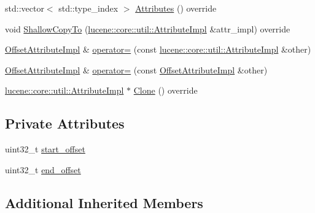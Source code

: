\begin{DoxyCompactItemize}
\item 
std\+::vector$<$ std\+::type\+\_\+index $>$ \mbox{\hyperlink{classlucene_1_1core_1_1analysis_1_1tokenattributes_1_1OffsetAttributeImpl_ac2f3c035417acfc9056a900903f1d271}{Attributes}} () override
\item 
void \mbox{\hyperlink{classlucene_1_1core_1_1analysis_1_1tokenattributes_1_1OffsetAttributeImpl_a426d0cd75306c4ef7cec3c28e34c0029}{Shallow\+Copy\+To}} (\mbox{\hyperlink{classlucene_1_1core_1_1util_1_1AttributeImpl}{lucene\+::core\+::util\+::\+Attribute\+Impl}} \&attr\+\_\+impl) override
\item 
\mbox{\hyperlink{classlucene_1_1core_1_1analysis_1_1tokenattributes_1_1OffsetAttributeImpl}{Offset\+Attribute\+Impl}} \& \mbox{\hyperlink{classlucene_1_1core_1_1analysis_1_1tokenattributes_1_1OffsetAttributeImpl_ad5aee8c4731cfda2c9a1c7b7dbe4dc30}{operator=}} (const \mbox{\hyperlink{classlucene_1_1core_1_1util_1_1AttributeImpl}{lucene\+::core\+::util\+::\+Attribute\+Impl}} \&other)
\item 
\mbox{\hyperlink{classlucene_1_1core_1_1analysis_1_1tokenattributes_1_1OffsetAttributeImpl}{Offset\+Attribute\+Impl}} \& \mbox{\hyperlink{classlucene_1_1core_1_1analysis_1_1tokenattributes_1_1OffsetAttributeImpl_ab26c5fb656b41c725bb7207da7877c4a}{operator=}} (const \mbox{\hyperlink{classlucene_1_1core_1_1analysis_1_1tokenattributes_1_1OffsetAttributeImpl}{Offset\+Attribute\+Impl}} \&other)
\item 
\mbox{\hyperlink{classlucene_1_1core_1_1util_1_1AttributeImpl}{lucene\+::core\+::util\+::\+Attribute\+Impl}} $\ast$ \mbox{\hyperlink{classlucene_1_1core_1_1analysis_1_1tokenattributes_1_1OffsetAttributeImpl_a4cae4e770c4ce5184ae4530edde06bae}{Clone}} () override
\end{DoxyCompactItemize}
\subsection*{Private Attributes}
\begin{DoxyCompactItemize}
\item 
uint32\+\_\+t \mbox{\hyperlink{classlucene_1_1core_1_1analysis_1_1tokenattributes_1_1OffsetAttributeImpl_a1e2b8c747f3f0216a9044b9fd61ea843}{start\+\_\+offset}}
\item 
uint32\+\_\+t \mbox{\hyperlink{classlucene_1_1core_1_1analysis_1_1tokenattributes_1_1OffsetAttributeImpl_a2e25d7e34687e7d39baaaf88636238c7}{end\+\_\+offset}}
\end{DoxyCompactItemize}
\subsection*{Additional Inherited Members}


